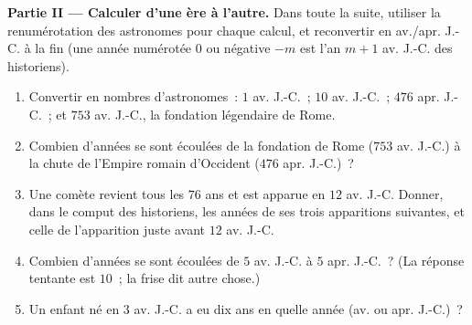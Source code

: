 \begin{problem}
\medskip
\noindent\textbf{Partie II --- Calculer d'une ère à l'autre.}
Dans toute la suite, utiliser la renumérotation des astronomes pour
chaque calcul, et reconvertir en av./apr. J.-C. à la fin (une année
numérotée $0$ ou négative $-m$ est l'an $m + 1$ av. J.-C. des
historiens).
\begin{enumerate}[resume]
  \item Convertir en nombres d'astronomes~: $1$ av. J.-C.~; $10$
        av. J.-C.~; $476$ apr. J.-C.~; et $753$ av. J.-C., la
        fondation légendaire de Rome.
  \item Combien d'années se sont écoulées de la fondation de Rome
        ($753$ av. J.-C.) à la chute de l'Empire romain d'Occident
        ($476$ apr. J.-C.)~?
  \item Une comète revient tous les $76$ ans et est apparue en $12$
        av. J.-C. Donner, dans le comput des historiens, les années
        de ses trois apparitions suivantes, et celle de l'apparition
        juste avant $12$ av. J.-C.
  \item Combien d'années se sont écoulées de $5$ av. J.-C. à $5$
        apr. J.-C.~? (La réponse tentante est $10$~; la frise dit
        autre chose.)
  \item Un enfant né en $3$ av. J.-C. a eu dix ans en quelle année
        (av. ou apr. J.-C.)~?
\end{enumerate}


\end{problem}
